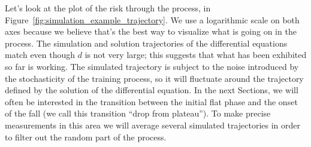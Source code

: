 Let's look at the plot of the risk through the process, in Figure~\ref{fig:simulation_example_trajectory}.
We use a logarithmic scale on both axes because we believe that's the best way to visualize what is going on in the process.
The simulation and solution trajectories of the differential equations match even though \(d\) is not very large;
this suggests that what has been exhibited so far is working. The simulated trajectory is subject to the noise introduced by the stochasticity of the training process,
so it will fluctuate around the trajectory defined by the solution of the differential equation. 
In the next Sections, we will often be interested in the transition between the initial flat phase and the onset of the fall (we call this transition ``drop from plateau'').
To make precise measurements in this area we will average several simulated trajectories in order to filter out the random part of the process.

